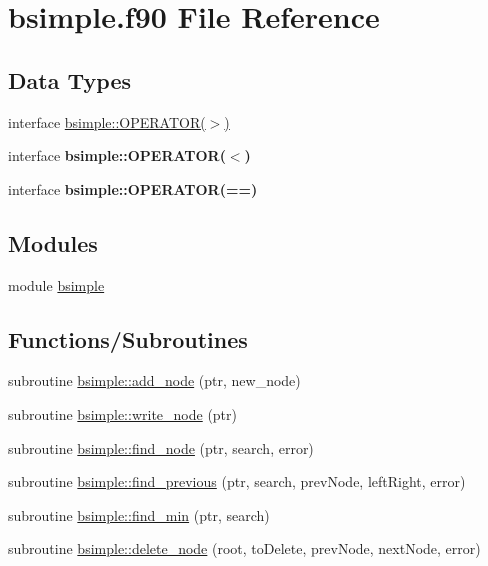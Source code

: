 \hypertarget{bsimple_8f90}{
\section{bsimple.f90 File Reference}
\label{bsimple_8f90}
}
\subsection*{Data Types}
\begin{DoxyCompactItemize}
\item 
interface \hyperlink{interfacebsimple_1_1OPERATOR_07_4_08}{bsimple::OPERATOR($>$)}
\item 
interface {\bfseries bsimple::OPERATOR($<$)}
\item 
interface {\bfseries bsimple::OPERATOR(==)}
\end{DoxyCompactItemize}
\subsection*{Modules}
\begin{DoxyCompactItemize}
\item 
module \hyperlink{namespacebsimple}{bsimple}
\end{DoxyCompactItemize}
\subsection*{Functions/Subroutines}
\begin{DoxyCompactItemize}
\item 
subroutine \hyperlink{namespacebsimple_a98a0fa9db2215d588a0a87c08065809f}{bsimple::add\_\-node} (ptr, new\_\-node)
\item 
subroutine \hyperlink{namespacebsimple_ae6c8fc172ff255d4d825b1f507d9fd82}{bsimple::write\_\-node} (ptr)
\item 
subroutine \hyperlink{namespacebsimple_abe5b608758a905e30ed8661e177395d6}{bsimple::find\_\-node} (ptr, search, error)
\item 
subroutine \hyperlink{namespacebsimple_a021b297f11aa3649405b7931d0979be9}{bsimple::find\_\-previous} (ptr, search, prevNode, leftRight, error)
\item 
subroutine \hyperlink{namespacebsimple_a11b24c82d3405b40e38891f5b2de1eeb}{bsimple::find\_\-min} (ptr, search)
\item 
subroutine \hyperlink{namespacebsimple_a4cb5aa13e4c5a527c7573ccbd5234162}{bsimple::delete\_\-node} (root, toDelete, prevNode, nextNode, error)
\end{DoxyCompactItemize}
